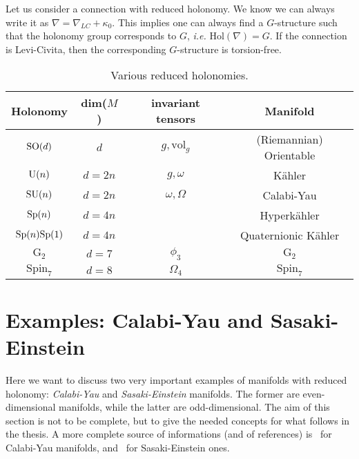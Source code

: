 \documentclass[debug]{phd}
\begin{document}
					Let us consider a connection with reduced holonomy. 
					We know we can always write it as $\nabla = \nabla_{LC} + \kappa_0$.
					This implies one can always find a $G$-structure such that the holonomy group corresponds to $G$, \emph{i.e.} $\mathrm{Hol}(\nabla) = G$.
					If the connection is Levi-Civita, then the corresponding $G$-structure is torsion-free.
							\begin{table}[h!]
							\centering
								\begin{tabular}{c | c | c | c}
									Holonomy					&			dim($M$)							&	invariant tensors		&	Manifold				\\
									\midrule
									$\mathrm{SO}(d)$					& 			$d$								&	$g, \mathrm{vol}_g$		&	(Riemannian) Orientable	\\[1.2mm]
									$\mathrm{U}(n) $	 				&			$d = 2n$							&	$g, \omega$			&	K\"ahler				\\[1.2mm]
									$\mathrm{SU}(n)$		 			&			$d = 2n$							&	$\omega, \Omega$		&	Calabi-Yau			\\[1.2mm]
									$\mathrm{Sp}(n)$		 			&			$d = 4n$							&						&	Hyperk\"ahler			\\[1.2mm]
									$\mathrm{Sp}(n) \mathrm{Sp}(1)$				&			$d = 4n$							&						&	Quaternionic K\"ahler	\\[1.2mm]
									$\mathrm{G}_2$		 	&			$d = 7$							&		$\phi_3$			&	$\mathrm{G}_2$		\\[1.2mm]
									$\mathrm{Spin}_7$		 	&			$d = 8$							&		$\Omega_4$		&	$\mathrm{Spin}_7$		\\
									\bottomrule
								\end{tabular}
								\caption{Various reduced holonomies.}
								\label{tabhol}
							\end{table}
			\section{Examples: Calabi-Yau and Sasaki-Einstein}
			\label{CYSE}
				Here we want to discuss two very important examples of manifolds with reduced holonomy: \emph{Calabi-Yau} and \emph{Sasaki-Einstein} manifolds.
				The former are even-dimensional manifolds, while the latter are odd-dimensional.
				The aim of this section is not to be complete, but to give the needed concepts for what follows in the thesis.
				A more complete source of informations (and of references) is~\cite{CalabiYauReview} for Calabi-Yau manifolds, and~\cite{SparksSE} for Sasaki-Einstein ones.
				
\end{document}
